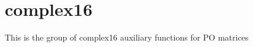 \hypertarget{group__complex16POauxiliary}{}\section{complex16}
\label{group__complex16POauxiliary}
This is the group of complex16 auxiliary functions for P\+O matrices 